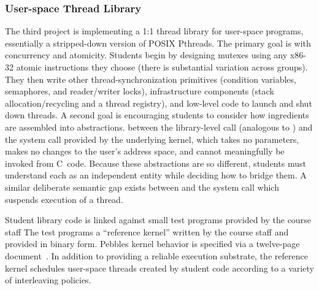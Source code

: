 \subsubsection{User-space Thread Library}
The third project is implementing a 1:1 thread library for
user-space programs,
essentially a stripped-down
version of POSIX Pthreads.
The primary goal is
with concurrency and atomicity.
Students begin by designing mutexes using any
x86-32 atomic instructions they choose
(there is substantial variation across groups).
They then write other thread-synchronization
primitives (condition variables, semaphores,
and reader/writer locks), infrastructure
components (stack allocation/recycling and
a thread registry),
and low-level code to launch and shut down
threads.
A second goal is encouraging students to
consider how ingredients are assembled into
abstractions.
between the library-level 
call (analogous to )
and the  system call provided
by the underlying kernel,
which takes no parameters,
makes no changes to the user's address space,
and cannot meaningfully
be invoked from C~code.
Because these abstractions are so different,
students must
understand each as an independent entity while
deciding how to bridge them.
A similar deliberate semantic gap exists between
 and the system call
which suspends execution of a thread.

Student library code is linked against small
test programs provided by the course staff
The test programs  a ``reference kernel'' written by
the course staff
and provided in binary form.
%
Pebbles kernel behavior is specified
via a twelve-page document~\cite{kspec}.
In addition to providing a reliable execution
substrate,
the reference kernel schedules
 user-space threads created by
student code according to a variety of
interleaving policies.

